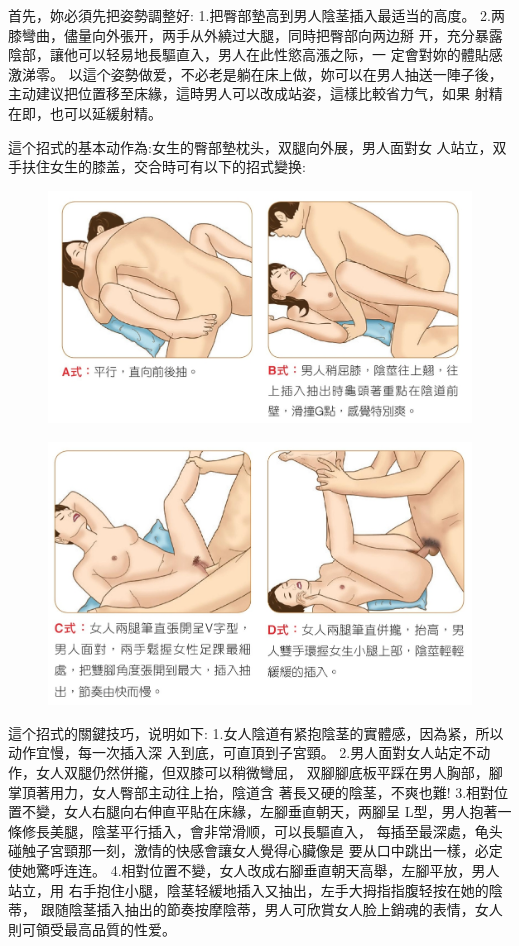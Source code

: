 \documentclass[12pt,UTF8]{ctexbook}
\begin{document}
首先，妳必須先把姿勢調整好:
1.把臀部墊高到男人陰茎插入最适当的高度。
2.两膝彎曲，儘量向外張开，两手从外繞过大腿，同時把臀部向两边掰
开，充分暴露陰部，讓他可以轻易地長驅直入，男人在此性慾高漲之际，一
定會對妳的體貼感激涕零。
以這个姿勢做爱，不必老是躺在床上做，妳可以在男人抽送一陣子後，
主动建议把位置移至床緣，這時男人可以改成站姿，這樣比較省力气，如果
射精在即，也可以延緩射精。

這个招式的基本动作為:女生的臀部墊枕头，双腿向外展，男人面對女
人站立，双手扶住女生的膝盖，交合時可有以下的招式變换:

\begin{figure}[htbp]
	\centering
	\includegraphics[width=0.7\linewidth]{29}
	\caption{}
	\label{fig:1}
\end{figure}

\begin{figure}[htbp]
	\centering
	\includegraphics[width=0.7\linewidth]{30}
	\caption{}
	\label{fig:1}
\end{figure}

這个招式的關鍵技巧，说明如下:
1.女人陰道有紧抱陰茎的實體感，因為紧，所以动作宜慢，每一次插入深
入到底，可直頂到子宮頸。
2.男人面對女人站定不动作，女人双腿仍然併攏，但双膝可以稍微彎屈，
双腳腳底板平踩在男人胸部，腳掌頂著用力，女人臀部主动往上抬，陰道含
著長又硬的陰茎，不爽也難!
3.相對位置不變，女人右腿向右伸直平貼在床緣，左腳垂直朝天，两腳呈
L型，男人抱著一條修長美腿，陰茎平行插入，會非常滑顺，可以長驅直入，
每插至最深處，龟头碰触子宮頸那一刻，激情的快感會讓女人覺得心臟像是
要从口中跳出一樣，必定使她驚呼连连。
4.相對位置不變，女人改成右腳垂直朝天高舉，左腳平放，男人站立，用
右手抱住小腿，陰茎轻緩地插入又抽出，左手大拇指指腹轻按在她的陰蒂，
跟随陰茎插入抽出的節奏按摩陰蒂，男人可欣賞女人脸上銷魂的表情，女人
則可領受最高品質的性爱。
\end{document}
